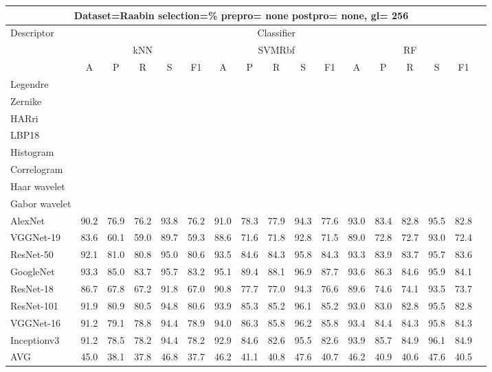 \documentclass[12pt,italian]{article}
\begin{document}
\begin{tiny}
 \pagebreak 
\begin{longtable}{lcccccccccccccccc}
\toprule
\multicolumn{16}{c}{Dataset=Raabin selection=\% prepro= none postpro= none, gl= 256} \\ 
\toprule
Descriptor & \multicolumn{15}{c}{Classifier} \\ 
& \multicolumn{5}{c}{kNN} & \multicolumn{5}{c}{SVMRbf} & \multicolumn{5}{c}{RF} \\ 
& A & P & R & S & F1 & A & P & R & S & F1 & A & P & R & S & F1 \\ 
\midrule
Legendre \\ 
Zernike \\ 
HARri \\ 
LBP18 \\ 
Histogram \\ 
Correlogram \\ 
Haar wavelet \\ 
Gabor wavelet \\ 
AlexNet & 90.2 & 76.9 & 76.2 & 93.8 & 76.2 & 91.0 & 78.3 & 77.9 & 94.3 & 77.6 & 93.0 & 83.4 & 82.8 & 95.5 & 82.8 \\ 
VGGNet-19 & 83.6 & 60.1 & 59.0 & 89.7 & 59.3 & 88.6 & 71.6 & 71.8 & 92.8 & 71.5 & 89.0 & 72.8 & 72.7 & 93.0 & 72.4 \\ 
ResNet-50 & 92.1 & 81.0 & 80.8 & 95.0 & 80.6 & 93.5 & 84.6 & 84.3 & 95.8 & 84.3 & 93.3 & 83.9 & 83.7 & 95.7 & 83.6 \\ 
GoogleNet & 93.3 & 85.0 & 83.7 & 95.7 & 83.2 & 95.1 & 89.4 & 88.1 & 96.9 & 87.7 & 93.6 & 86.3 & 84.6 & 95.9 & 84.1 \\ 
ResNet-18 & 86.7 & 67.8 & 67.2 & 91.8 & 67.0 & 90.8 & 77.7 & 77.0 & 94.3 & 76.6 & 89.6 & 74.6 & 74.1 & 93.5 & 73.7 \\ 
ResNet-101 & 91.9 & 80.9 & 80.5 & 94.8 & 80.6 & 93.9 & 85.3 & 85.2 & 96.1 & 85.2 & 93.0 & 83.0 & 82.8 & 95.5 & 82.8 \\ 
VGGNet-16 & 91.2 & 79.1 & 78.8 & 94.4 & 78.9 & 94.0 & 86.3 & 85.8 & 96.2 & 85.8 & 93.4 & 84.4 & 84.3 & 95.8 & 84.3 \\ 
Inceptionv3 & 91.2 & 78.5 & 78.2 & 94.4 & 78.2 & 92.9 & 84.6 & 82.6 & 95.5 & 82.6 & 93.9 & 85.7 & 84.9 & 96.1 & 84.9 \\ 
\hline
AVG & 45.0 & 38.1 & 37.8 & 46.8 & 37.7 & 46.2 & 41.1 & 40.8 & 47.6 & 40.7 & 46.2 & 40.9 & 40.6 & 47.6 & 40.5 \\ 
\hline
\bottomrule
\end{longtable} 

 \pagebreak 
\end{tiny} 
 
\end{document}
